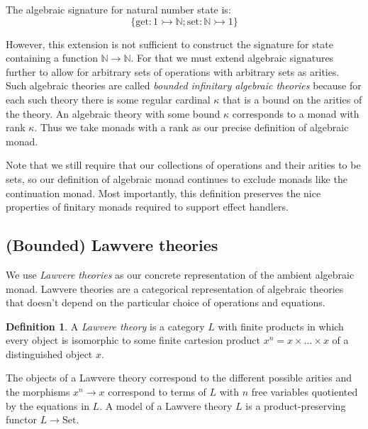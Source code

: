 \documentclass[acmsmall, screen, nonacm]{acmart}
\theoremstyle{definition}
\newtheorem{definition}{Definition}[section]
\newcommand{\nat}{\mathbb{N}}
\newcommand{\setc}{\mathrm{Set}}
\newcommand{\types}{\mathrel{:}}
\begin{document}
\begin{example}
  The algebraic signature for natural number state is:
  \begin{equation*}
    \{ \mathrm{get} \types 1 \rightarrowtail \nat;
       \mathrm{set} \types \nat \rightarrowtail 1 \}
  \end{equation*}
\end{example}

However, this extension is not sufficient to construct the signature for
state containing a function $\nat \rightarrow \nat$. For that we must
extend algebraic signatures further to allow for arbitrary sets of
operations with arbitrary sets as arities. Such algebraic theories are
called \emph{bounded infinitary algebraic theories} because for each
such theory there is some regular cardinal $\kappa$ that is a bound on
the arities of the theory. An algebraic theory with some bound $\kappa$
corresponds to a monad with rank $\kappa$. Thus we take monads with a
rank as our precise definition of algebraic monad.

Note that we still require that our collections of operations and their
arities to be sets, so our definition of algebraic monad continues to
exclude monads like the continuation monad. Most importantly, this
definition preserves the nice properties of finitary monads required to
support effect handlers.

\subsection{(Bounded) Lawvere theories}

We use \emph{Lawvere theories} as our concrete representation of the
ambient algebraic monad. Lawvere theories are a categorical
representation of algebraic theories that doesn't depend on the
particular choice of operations and equations.

\begin{definition}
  A \emph{Lawvere theory} is a category $L$ with finite products in
  which every object is isomorphic to some finite cartesion product
  $x^n = x \times \ldots \times x$ of a distinguished object $x$.
\end{definition}
The objects of a Lawvere theory correspond to the different possible
arities and the morphisms $x^n \rightarrow x$ correspond to terms
of $L$ with $n$ free variables quotiented by the equations in $L$. A
model of a Lawvere theory $L$ is a product-preserving functor
$L \rightarrow \setc$.
\end{document}
